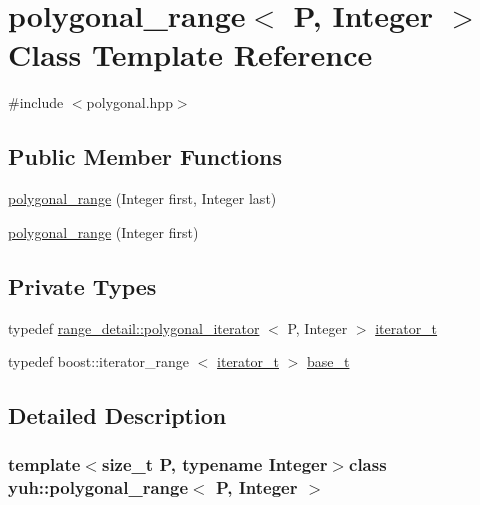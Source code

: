\hypertarget{classyuh_1_1polygonal__range}{\section{polygonal\-\_\-range$<$ \-P, \-Integer $>$ \-Class \-Template \-Reference}
\label{d5/d2a/classyuh_1_1polygonal__range}
}


{\ttfamily \#include $<$polygonal.\-hpp$>$}

\subsection*{\-Public \-Member \-Functions}
\begin{DoxyCompactItemize}
\item 
\hyperlink{classyuh_1_1polygonal__range_a21bf2b09c54090fdc482e34cde6571b4}{polygonal\-\_\-range} (\-Integer first, \-Integer last)
\item 
\hyperlink{classyuh_1_1polygonal__range_af87030a4d0bf0a744a730d346d8d70f1}{polygonal\-\_\-range} (\-Integer first)
\end{DoxyCompactItemize}
\subsection*{\-Private \-Types}
\begin{DoxyCompactItemize}
\item 
typedef \*
\hyperlink{classyuh_1_1range__detail_1_1polygonal__iterator}{range\-\_\-detail\-::polygonal\-\_\-iterator}\*
$<$ \-P, \-Integer $>$ \hyperlink{classyuh_1_1polygonal__range_a824fcddb551991ff7719d081b900e909}{iterator\-\_\-t}
\item 
typedef boost\-::iterator\-\_\-range\*
$<$ \hyperlink{classyuh_1_1polygonal__range_a824fcddb551991ff7719d081b900e909}{iterator\-\_\-t} $>$ \hyperlink{classyuh_1_1polygonal__range_a9d51b0fc63206906184824c5b08403b2}{base\-\_\-t}
\end{DoxyCompactItemize}


\subsection{\-Detailed \-Description}
\subsubsection*{template$<$size\-\_\-t \-P, typename \-Integer$>$class yuh\-::polygonal\-\_\-range$<$ P, Integer $>$}

